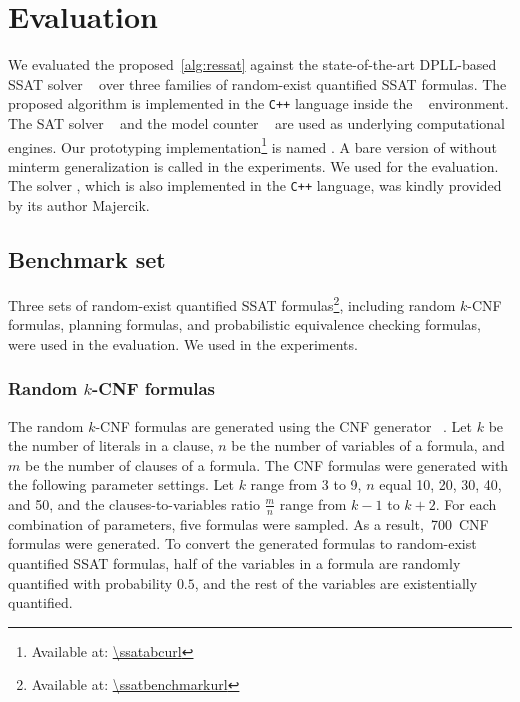 \newcommand{\nrandom}{\num{700}}
\newcommand{\napplication}{\num{60}}
\newcommand{\nstrategic}{\num{60}}
\newcommand{\npec}{\num{60}}

\section{Evaluation}
\label{sect:ressat-evaluation}

We evaluated the proposed~\cref{alg:ressat} against
the state-of-the-art DPLL-based SSAT solver \dcssat~\cite{Majercik2005}
over three families of random-exist quantified SSAT formulas.
The proposed algorithm is implemented in the \texttt{C++} language inside the \abc~\cite{ABC} environment.
The SAT solver ~\cite{Een2003Solver}
and the model counter \cachet~\cite{Sang2004}
are used as underlying computational engines.
Our prototyping implementation\footnote{Available at: \url{\ssatabcurl}} is named \ressat.
A bare version of \ressat without minterm generalization is called \ressatb in the experiments.
We used \ssatABCRevision for the evaluation.
The solver \dcssat,
which is also implemented in the \texttt{C++} language,
was kindly provided by its author Majercik.

\subsection{Benchmark set}
Three sets of random-exist quantified SSAT formulas\footnote{Available at: \url{\ssatbenchmarkurl}},
including random $k$-CNF formulas,
planning formulas,
and probabilistic equivalence checking formulas,
were used in the evaluation.
We used \ssatBenchRevision in the experiments.

\subsubsection{Random $k$-CNF formulas}
The random $k$-CNF formulas are generated using the CNF generator \cnfgen~\cite{Lauria2017CNFgen}.
Let $k$ be the number of literals in a clause,
$n$ be the number of variables of a formula,
and $m$ be the number of clauses of a formula.
The CNF formulas were generated with the following parameter settings.
Let $k$ range from 3 to 9,
$n$ equal 10, 20, 30, 40, and 50,
and the clauses-to-variables ratio $\frac{m}{n}$ range from $k-1$ to $k+2$.
For each combination of parameters,
five formulas were sampled.
As a result,~\nrandom~CNF formulas were generated.
To convert the generated formulas to random-exist quantified SSAT formulas,
half of the variables in a formula are randomly quantified with probability $0.5$,
and the rest of the variables are existentially quantified.

